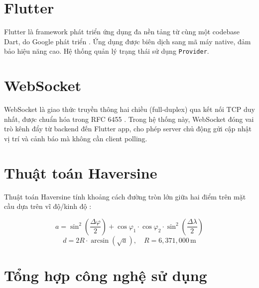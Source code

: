 \documentclass[13pt, a4paper]{report}
\begin{document}
\section{Flutter}

Flutter là framework phát triển ứng dụng đa nền tảng từ cùng một codebase Dart, do Google phát triển \cite{flutter2023}. Ứng dụng được biên dịch sang mã máy native, đảm bảo hiệu năng cao. Hệ thống quản lý trạng thái sử dụng \texttt{Provider}.

\section{WebSocket}

WebSocket là giao thức truyền thông hai chiều (full-duplex) qua kết nối TCP duy nhất, được chuẩn hóa trong RFC 6455 \cite{fette2011websocket}. Trong hệ thống này, WebSocket đóng vai trò kênh đẩy từ backend đến Flutter app, cho phép server chủ động gửi cập nhật vị trí và cảnh báo mà không cần client polling.

\section{Thuật toán Haversine}

Thuật toán Haversine tính khoảng cách đường tròn lớn giữa hai điểm trên mặt cầu dựa trên vĩ độ/kinh độ \cite{sinnott1984virtues}:

\begin{equation}
  a = \sin^2\!\left(\frac{\Delta\varphi}{2}\right) + \cos\varphi_1 \cdot \cos\varphi_2 \cdot \sin^2\!\left(\frac{\Delta\lambda}{2}\right)
  \label{eq:haversine_a}
\end{equation}
\begin{equation}
  d = 2R \cdot \arcsin\!\left(\sqrt{a}\right), \quad R = 6{,}371{,}000\,\text{m}
  \label{eq:haversine_d}
\end{equation}

\section{Tổng hợp công nghệ sử dụng}
\end{document}
